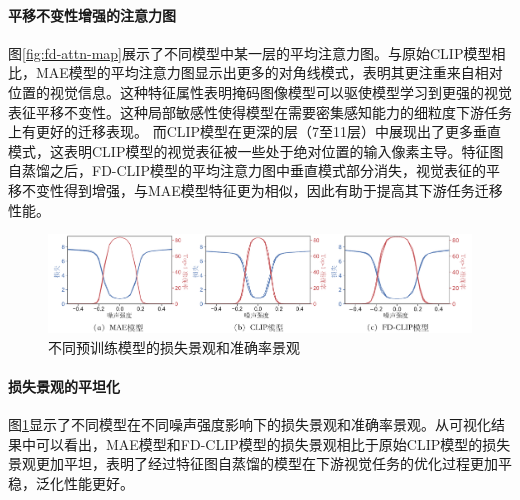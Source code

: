 \paragraph{平移不变性增强的注意力图} 图\ref{fig:fd-attn-map}展示了不同模型中某一层的平均注意力图。与原始CLIP模型相比，MAE模型的平均注意力图显示出更多的对角线模式，表明其更注重来自相对位置的视觉信息。这种特征属性表明掩码图像模型可以驱使模型学习到更强的视觉表征平移不变性。这种局部敏感性使得模型在需要密集感知能力的细粒度下游任务上有更好的迁移表现。
而CLIP模型在更深的层（7至11层）中展现出了更多垂直模式，这表明CLIP模型的视觉表征被一些处于绝对位置的输入像素主导。特征图自蒸馏之后，FD-CLIP模型的平均注意力图中垂直模式部分消失，视觉表征的平移不变性得到增强，与MAE模型特征更为相似，因此有助于提高其下游任务迁移性能。

\begin{figure}
  \centering
  \includegraphics[width=1.0\linewidth]{figures/fd-loss-landscape.pdf}
  \caption{不同预训练模型的损失景观和准确率景观}
  \label{fig:fd-loss-landscape}
\end{figure}

\paragraph{损失景观的平坦化} 图\ref{fig:fd-loss-landscape}显示了不同模型在不同噪声强度影响下的损失景观和准确率景观\cite{li2018visualizing}。从可视化结果中可以看出，MAE模型和FD-CLIP模型的损失景观相比于原始CLIP模型的损失景观更加平坦，表明了经过特征图自蒸馏的模型在下游视觉任务的优化过程更加平稳，泛化性能更好。%




